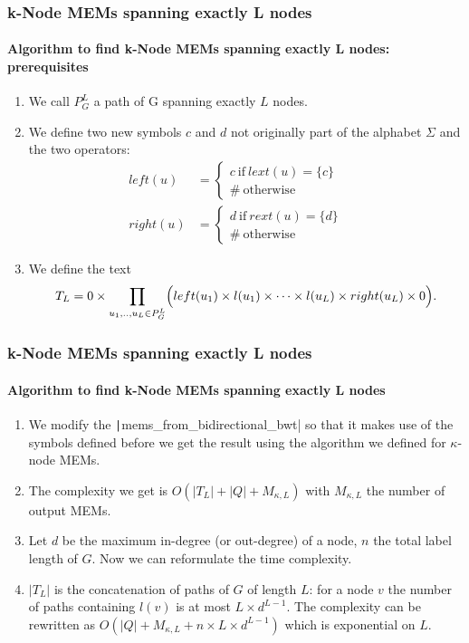 \begin{frame}
	\frametitle{k-Node MEMs spanning exactly L nodes}
	\framesubtitle{Algorithm to find k-Node MEMs spanning exactly L nodes: prerequisites}
	\begin{enumerate}
		\item We call \(P^{L}_{G}\) a path of G spanning exactly \(L\) nodes.
		\onslide<2-3>\item We define two new symbols \(c\) and \(d\) not originally part of the alphabet \(\Sigma\)
		and the two operators:
		\begin{align*}
			left(u) &= \left\{
				\begin{array}{l}
					c \ \text{if} \ lext(u) = \{c\} \\
					\# \ \text{otherwise}
				\end{array}
			\right. && \\
			right(u) &= \left\{
				\begin{array}{l}
					d \ \text{if} \ rext(u) = \{d\} \\
					\# \ \text{otherwise}
				\end{array}
			\right.
		\end{align*}
		\onslide<3> \item We define the text
		\[
			T_L = 0 \times \prod_{u_1,..,u_L \in P^{L}_{G}}
			\Bigl(left(u_1) \times l(u_1) \times \dots \times l(u_L) \times right(u_L) \times 0\Bigr).
		\]
	\end{enumerate}
\end{frame}

\begin{frame}[fragile]
	\frametitle{k-Node MEMs spanning exactly L nodes}
	\framesubtitle{Algorithm to find k-Node MEMs spanning exactly L nodes}
	\begin{enumerate}
		\item  We modify the \texttt|mems_from_bidirectional_bwt| so that it
		makes use of the symbols defined before we get the result using the
		algorithm we defined for \(\kappa\)-node MEMs.
		\onslide<2-4>\item The complexity we get is \(O(|T_L| + |Q| + M_{\kappa, L})\) with \(M_{\kappa, L}\)
		the number of output MEMs.
		\onslide<3-4>\item Let \(d\) be the maximum in-degree (or out-degree) of a node, \(n\) the total label length
		of \(G\). Now we can reformulate the time complexity.
		
		\item \(|T_L|\) is the concatenation of paths of \(G\) of length \(L\):
		for a node \(v\) the number of paths containing \(l(v)\)
		is at most \(L \times d^{L-1}\). The complexity can be rewritten as
		\(O(|Q| + M_{\kappa, L } + n \times L \times d^{L-1})\) which is exponential on \(L\).
	\end{enumerate}
\end{frame}
